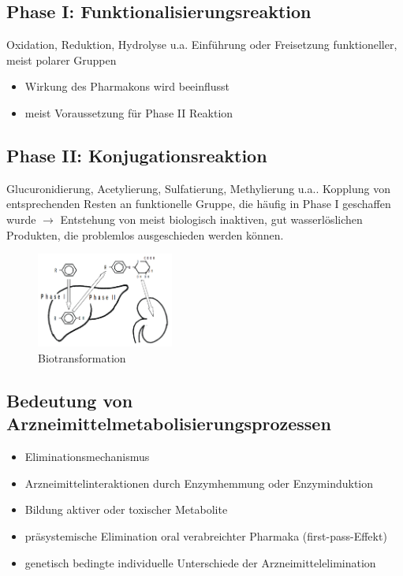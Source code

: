 \documentclass[10pt,a4paper]{report}
\begin{document}
\subsection{Phase I: Funktionalisierungsreaktion}
Oxidation, Reduktion, Hydrolyse u.a. Einführung oder Freisetzung funktioneller, meist polarer Gruppen 

\begin{itemize}
\item Wirkung des Pharmakons wird beeinflusst
\item meist Voraussetzung für Phase II Reaktion
\end{itemize}

\subsection{Phase II: Konjugationsreaktion}
Glucuronidierung, Acetylierung, Sulfatierung, Methylierung u.a.. Kopplung von entsprechenden Resten an funktionelle Gruppe, die häufig in Phase I geschaffen wurde $\rightarrow$ Entstehung von meist biologisch inaktiven, gut wasserlöslichen Produkten, die problemlos ausgeschieden werden können.

\begin{figure}
	\centering 
	\includegraphics[width=0.4\textwidth]{Bilder/Biotransformation.png} 
	\caption{Biotransformation} 
	\label{fig:Biotransformation}
\end{figure}

\subsection{Bedeutung von Arzneimittelmetabolisierungsprozessen}

\begin{itemize}
	\item Eliminationsmechanismus
	\item Arzneimittelinteraktionen durch Enzymhemmung oder Enzyminduktion
	\item Bildung aktiver oder toxischer Metabolite
	\item präsystemische Elimination oral verabreichter Pharmaka (first-pass-Effekt)
	\item genetisch bedingte individuelle Unterschiede der Arzneimittelelimination
\end{itemize}
\end{document}
